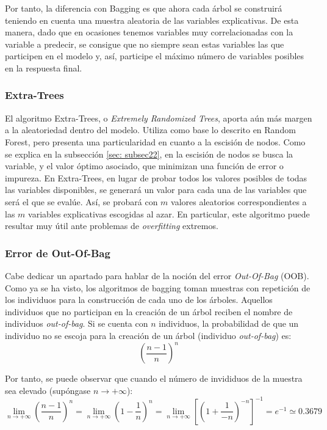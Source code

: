 \documentclass[12pt,twoside]{article}
\begin{document}
Por tanto, la diferencia con Bagging es que ahora cada árbol se construirá teniendo en cuenta una muestra aleatoria de las variables explicativas. De esta manera, dado que en ocasiones tenemos variables muy correlacionadas con la variable a predecir, se consigue que no siempre sean estas variables las que participen en el modelo y, así, participe el máximo número de variables posibles en la respuesta final.


\subsubsection{Extra-Trees} \label{sec:ExtraTrees}
El algoritmo Extra-Trees, o \textit{Extremely Randomized Trees}, aporta aún más margen a la aleatoriedad dentro del modelo. Utiliza como base lo descrito en Random Forest, pero presenta una particularidad en cuanto a la escisión de nodos. Como se explica en la subsección \ref{sec: subsec22}, en la escisión de nodos se busca la variable, y el valor óptimo asociado, que minimizan una función de error o impureza. En Extra-Trees, en lugar de probar todos los valores posibles de todas las variables disponibles, se generará un valor para cada una de las variables que será el que se evalúe. Así, se probará con $m$ valores aleatorios correspondientes a las $m$ variables explicativas escogidas al azar. En particular, este algoritmo puede resultar muy útil ante problemas de \textit{overfitting} extremos.


\subsubsection{Error de Out-Of-Bag}
Cabe dedicar un apartado para hablar de la noción del error \textit{Out-Of-Bag} (OOB). Como ya se ha visto, los algoritmos de bagging toman muestras con repetición de los individuos para la construcción de cada uno de los árboles. Aquellos individuos que no participan en la creación de un árbol reciben el nombre de individuos \textit{out-of-bag}. Si se cuenta con $n$ individuos, la probabilidad de que un individuo no se escoja para la creación de un árbol (individuo \textit{out-of-bag}) es:
\begin{equation*}
\left( \frac{n-1}{n} \right)^n
\end{equation*}

Por tanto, se puede observar que cuando el número de invididuos de la muestra sea elevado (supóngase $n \rightarrow +\infty$):
\begin{equation*}
\lim_{n \rightarrow + \infty} \left( \frac{n-1}{n} \right)^n = \lim_{n \rightarrow +\infty} \left( 1 - \frac{1}{n} \right)^n = \lim_{n \rightarrow +\infty} \left[ \left( 1 + \frac{1}{-n} \right)^{-n} \right] ^{-1} = e^{-1} \simeq 0.3679
\end{equation*}
\end{document}
